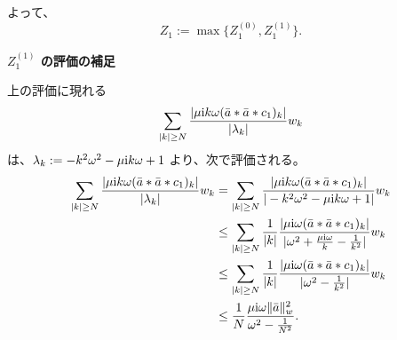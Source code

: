 よって、
$$
    Z_1 := \max\{Z_1^{(0)}, Z_1^{(1)}\}.
$$

\textbf{$Z_1^{(1)}$ の評価の補足}

上の評価に現れる
$$
\sum_{|k| \geq N} \frac{ |\mu \mathrm{i} k \omega ( \bar{a} * \bar{a} * c_1 )_k |}{|\lambda_k|} w_k \\
$$
は、$\lambda_k := -k^2 \omega^2 - \mu \mathrm{i} k \omega + 1$ より、次で評価される。
\footnotesize
\begin{align*}
\sum_{|k| \geq N} \frac{ |\mu \mathrm{i} k \omega ( \bar{a} * \bar{a} * c_1 )_k |}{|\lambda_k|} w_k 
&= \sum_{|k| \geq N} \frac{ |\mu \mathrm{i} k \omega ( \bar{a} * \bar{a} * c_1 )_k |}{|-k^2 \omega^2 - \mu \mathrm{i} k \omega + 1|} w_k \\
&\leq \sum_{|k| \geq N} \frac{1}{|k|} \frac{ |\mu \mathrm{i} \omega ( \bar{a} * \bar{a} * c_1 )_k |}{|\omega^2 + \frac{\mu \mathrm{i} \omega}{k} - \frac{1}{k^2}|} w_k \\
&\leq \sum_{|k| \geq N} \frac{1}{|k|} \frac{ |\mu \mathrm{i} \omega ( \bar{a} * \bar{a} * c_1 )_k |}{|\omega^2 - \frac{1}{k^2}|} w_k \\
&\leq \frac{1}{N} \frac{\mu \mathrm{i} \omega \|\bar{a} \|_{w}^2}{\omega^2 - \frac{1}{N^2}}.
\end{align*}
\normalsize

